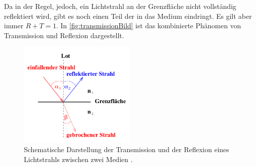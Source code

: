 \noindent
Da in der Regel, jedoch, ein Lichtstrahl an der Grenzfläche nicht vollständig reflektiert wird, gibt es noch einen Teil der in das Medium eindringt. Es gilt aber immer $R+T=1$.
In \autoref{fig:transmissionBild} ist das kombinierte Phänomen von Transmission und Reflexion dargestellt.

\begin{figure}[H]
    \centering
    \includegraphics[width=0.5\textwidth]{data/transmission.png}
    \caption{Schematische Darstellung der Transmission und der Reflexion eines Lichtstrahls zwischen zwei Medien \cite{Anleitung400}.}
    \label{fig:transmissionBild}
\end{figure}

